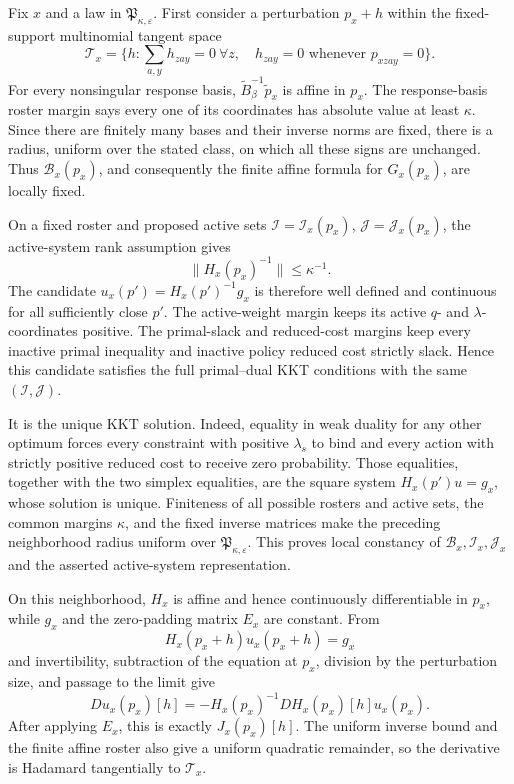 Fix \(x\) and a law in \(\mathfrak P_{\kappa,\varepsilon}\).  First consider a perturbation \(p_x+h\) within the fixed-support multinomial tangent space
\[
 \mathcal T_x=\{h:\sum_{a,y}h_{zay}=0\ \forall z,\quad h_{zay}=0\text{ whenever }p_{xzay}=0\}.
\]
For every nonsingular response basis, \(\widetilde B_\beta^{-1}\widetilde p_x\) is affine in \(p_x\).  The response-basis roster margin says every one of its coordinates has absolute value at least \(\kappa\).  Since there are finitely many bases and their inverse norms are fixed, there is a radius, uniform over the stated class, on which all these signs are unchanged.  Thus \(\mathcal B_x(p_x)\), and consequently the finite affine formula for \(G_x(p_x)\), are locally fixed.

On a fixed roster and proposed active sets \(\mathcal I=\mathcal I_x(p_x)\), \(\mathcal J=\mathcal J_x(p_x)\), the active-system rank assumption gives
\[
 \|H_x(p_x)^{-1}\|\leq\kappa^{-1}.
\]
The candidate \(u_x(p')=H_x(p')^{-1}g_x\) is therefore well defined and continuous for all sufficiently close \(p'\).  The active-weight margin keeps its active \(q\)- and \(\lambda\)-coordinates positive.  The primal-slack and reduced-cost margins keep every inactive primal inequality and inactive policy reduced cost strictly slack.  Hence this candidate satisfies the full primal--dual KKT conditions with the same \((\mathcal I,\mathcal J)\).

It is the unique KKT solution.  Indeed, equality in weak duality for any other optimum forces every constraint with positive \(\lambda_s\) to bind and every action with strictly positive reduced cost to receive zero probability.  Those equalities, together with the two simplex equalities, are the square system \(H_x(p')u=g_x\), whose solution is unique.  Finiteness of all possible rosters and active sets, the common margins \(\kappa\), and the fixed inverse matrices make the preceding neighborhood radius uniform over \(\mathfrak P_{\kappa,\varepsilon}\).  This proves local constancy of \(\mathcal B_x,\mathcal I_x,\mathcal J_x\) and the asserted active-system representation.

On this neighborhood, \(H_x\) is affine and hence continuously differentiable in \(p_x\), while \(g_x\) and the zero-padding matrix \(E_x\) are constant.  From
\[
 H_x(p_x+h)u_x(p_x+h)=g_x
\]
and invertibility, subtraction of the equation at \(p_x\), division by the perturbation size, and passage to the limit give
\[
 Du_x(p_x)[h]=-H_x(p_x)^{-1}DH_x(p_x)[h]u_x(p_x).
\]
After applying \(E_x\), this is exactly \(J_x(p_x)[h]\).  The uniform inverse bound and the finite affine roster also give a uniform quadratic remainder, so the derivative is Hadamard tangentially to \(\mathcal T_x\).


